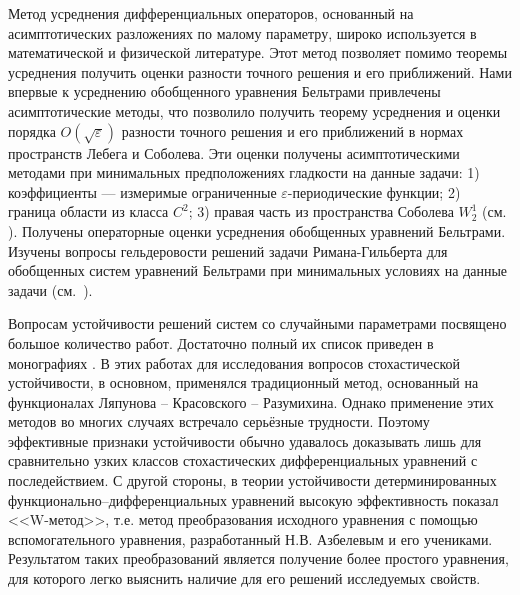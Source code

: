 Метод усреднения дифференциальных операторов, основанный на асимптотических
разложениях по малому параметру, широко используется  в математической и
физической литературе. Этот метод позволяет помимо теоремы усреднения
получить оценки разности точного решения и его приближений. Нами впервые
к усреднению обобщенного уравнения Бельтрами привлечены асимптотические
методы, что позволило получить теорему усреднения и оценки порядка
$O(\sqrt{\varepsilon})$  разности точного решения и его приближений
в нормах пространств Лебега и Соболева. Эти оценки получены
асимптотическими методами при минимальных предположениях гладкости
на данные задачи: 1) коэффициенты --- измеримые ограниченные
$\varepsilon$-периодические функции; 2) граница области из класса $C^2$; 3) правая часть из пространства Соболева $W_2^1$ (см. \cite{1, 2, 4}).
Получены операторные оценки усреднения обобщенных уравнений Бельтрами.
Изучены вопросы гельдеровости решений задачи Римана-Гильберта для
обобщенных систем уравнений Бельтрами при минимальных
условиях на данные задачи (см.\, \cite{3, 5, 6, 7, 8, 9, 10}).

Вопросам устойчивости решений систем со случайными параметрами
посвящено большое количество работ. Достаточно полный их список
приведен в монографиях \cite{kad1,kad2,kad3,kad4}. В этих работах для исследования
вопросов стохастической устойчивости, в основном, применялся
традиционный метод, основанный на функционалах
Ляпунова -- Красовского -- Разумихина. Однако применение этих методов во
многих случаях встречало серьёзные трудности. Поэтому эффективные
признаки устойчивости обычно удавалось доказывать лишь для
сравнительно узких классов стохастических дифференциальных уравнений
с последействием. С другой стороны, в теории устойчивости
детерминированных функционально--дифференциальных уравнений высокую
эффективность показал <<W-метод>>, т.е. метод преобразования
исходного уравнения с помощью вспомогательного уравнения,
разработанный Н.В. Азбелевым и его учениками. Результатом таких
преобразований является получение более простого уравнения, для
которого легко выяснить наличие для его решений исследуемых свойств.

